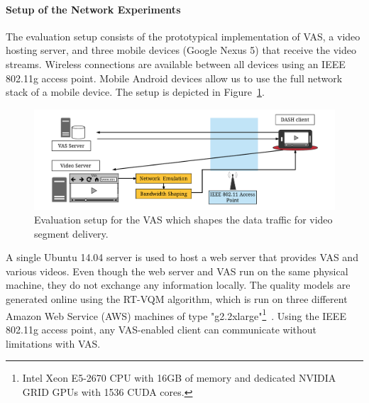 \paragraph{Setup of the Network Experiments}
The evaluation setup consists of the prototypical implementation of \ac{VAS}, a video hosting server, and three mobile devices (Google Nexus 5) that receive the video streams.
Wireless connections are available between all devices using an IEEE 802.11g access point.
Mobile Android devices allow us to use the full network stack of a mobile device. 
The setup is depicted in Figure~\ref{fig:network_setup}.
\begin{figure}[!tbh]
\centering
\includegraphics[width=\linewidth]{./gfx/700_VAS/setup}
\caption[Evaluation setup for \ac{VAS}]{Evaluation setup for the \ac{VAS} which shapes the data traffic for video segment delivery.}
\label{fig:network_setup}
\end{figure}

A single Ubuntu 14.04 server is used to host a web server that provides \ac{VAS} and various videos.
Even though the web server and \ac{VAS} run on the same physical machine, they do not exchange any information locally.
The quality models are generated online using the \ac{RT-VQM} algorithm, which is run on three different Amazon Web Service (AWS) machines of type "g2.2xlarge"\footnote{Intel Xeon E5-2670 \ac{CPU} with 16GB of memory and dedicated NVIDIA GRID \ac{GPU}s with 1536 \ac{CUDA} cores.}~\cite{Wichtlhuber2016}.
Using the IEEE 802.11g access point, any VAS-enabled client can communicate without limitations with VAS.

